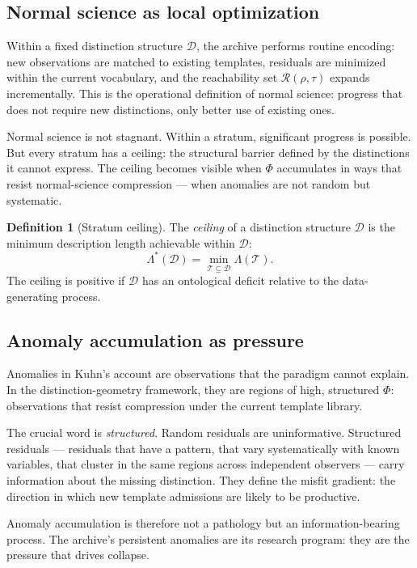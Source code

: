 \documentclass[11pt, a4paper]{article}
\theoremstyle{plain}
\theoremstyle{definition}
\newtheorem{definition}[theorem]{Definition}
\theoremstyle{remark}
\newcommand{\Dist}{\mathcal{D}}
\newcommand{\Reach}{\mathcal{R}}
\newcommand{\PhiF}{\varPhi}
\newcommand{\Tlib}{\mathcal{T}}
\newcommand{\Lam}{\Lambda}
\begin{document}
\subsection{Normal science as local optimization}

Within a fixed distinction structure $\Dist$, the archive performs
routine encoding: new observations are matched to existing templates,
residuals are minimized within the current vocabulary, and the
reachability set $\Reach(\rho, \tau)$ expands incrementally.
This is the operational definition of normal science: progress
that does not require new distinctions, only better use of
existing ones.

Normal science is not stagnant. Within a stratum, significant
progress is possible. But every stratum has a ceiling: the
structural barrier defined by the distinctions it cannot express.
The ceiling becomes visible when $\PhiF$ accumulates in ways that
resist normal-science compression --- when anomalies are not
random but systematic.

\begin{definition}[Stratum ceiling]
The \emph{ceiling} of a distinction structure $\Dist$ is the
minimum description length achievable within $\Dist$:
\[
  \Lam^*(\Dist) = \min_{\Tlib \subseteq \Dist} \Lam(\Tlib).
\]
The ceiling is positive if $\Dist$ has an ontological deficit
relative to the data-generating process.
\end{definition}

\subsection{Anomaly accumulation as pressure}

Anomalies in Kuhn's account are observations that the paradigm
cannot explain. In the distinction-geometry framework, they are
regions of high, structured $\PhiF$: observations that resist
compression under the current template library.

The crucial word is \emph{structured}. Random residuals are
uninformative. Structured residuals --- residuals that have a
pattern, that vary systematically with known variables, that
cluster in the same regions across independent observers ---
carry information about the missing distinction. They define
the misfit gradient: the direction in which new template
admissions are likely to be productive.

Anomaly accumulation is therefore not a pathology but an
information-bearing process. The archive's persistent anomalies
are its research program: they are the pressure that drives
collapse.
\end{document}
